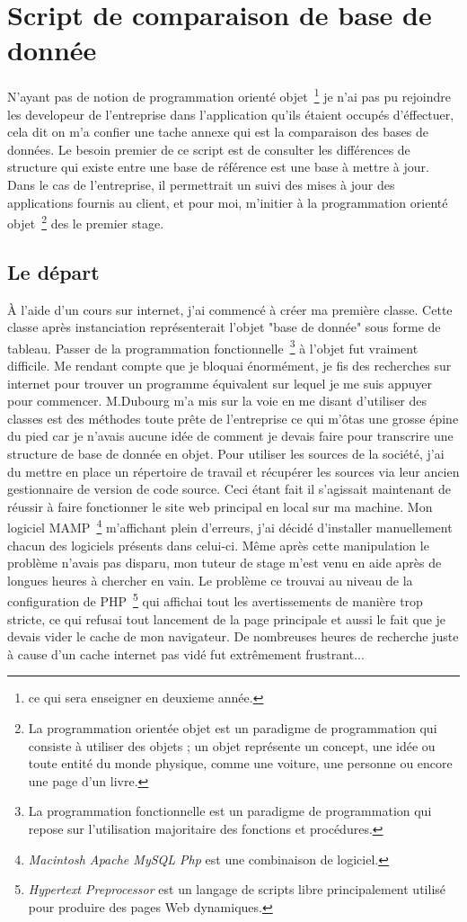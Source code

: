 \chapter{Script de comparaison de base de donnée}

N'ayant pas de notion de programmation orienté objet\, \footnote{ce qui sera
enseigner en deuxieme année.} je n'ai pas pu rejoindre les developeur de
l'entreprise dans l'application qu'ils étaient occupés d'éffectuer, cela dit on
m'a confier une tache annexe qui est la comparaison des bases de données. Le
besoin premier de ce script est de consulter les différences de structure qui
existe entre une base de référence est une base à mettre à jour. Dans le cas de
l'entreprise, il permettrait un suivi des mises à jour des applications fournis
au client, et pour moi, m'initier à la programmation orienté objet\,
\footnote{La programmation orientée objet est un paradigme de programmation qui
consiste à utiliser des objets ; un objet représente un concept, une idée ou
toute entité du monde physique, comme une voiture, une personne ou encore une
page d'un livre.} des le premier stage.

\section{Le départ}

À l'aide d'un cours sur internet, j'ai commencé à créer ma première classe.
Cette classe après instanciation représenterait l'objet "base de donnée" sous
forme de tableau.  Passer de la programmation fonctionnelle\, \footnote{La
programmation fonctionnelle est un paradigme de programmation qui repose sur
l'utilisation majoritaire des fonctions et procédures.} à l'objet fut vraiment
difficile. Me rendant compte que je bloquai énormément, je fis des recherches
sur internet pour trouver un programme équivalent sur lequel je me suis appuyer
pour commencer. M.Dubourg m'a mis sur la voie en me disant d'utiliser des
classes est des méthodes toute prête de l'entreprise ce qui m'ôtas une grosse
épine du pied car je n'avais aucune idée de comment je devais faire pour
transcrire une structure de base de donnée en objet. Pour utiliser les sources
de la société, j'ai du mettre en place un répertoire de travail et récupérer
les sources via leur ancien gestionnaire de version de code source.  Ceci étant
fait il s'agissait maintenant de réussir à faire fonctionner le site web
principal en local sur ma machine. Mon logiciel MAMP\, \footnote{\emph{Macintosh
Apache MySQL Php} est une combinaison de logiciel.} m'affichant plein d'erreurs,
j'ai décidé d'installer manuellement chacun des logiciels présents dans
celui-ci.  Même après cette manipulation le problème n'avais pas disparu, mon
tuteur de stage m'est venu en aide après de longues heures à chercher en vain.
Le problème ce trouvai au niveau de la configuration de PHP\,
\footnote{\emph{Hypertext Preprocessor} est un langage de scripts libre
principalement utilisé pour produire des pages Web dynamiques.} qui affichai
tout les avertissements de manière trop stricte, ce qui refusai tout lancement
de la page principale et aussi le fait que je devais vider le cache de mon
navigateur. De nombreuses heures de recherche juste à cause d'un cache internet
pas vidé fut extrêmement frustrant...

